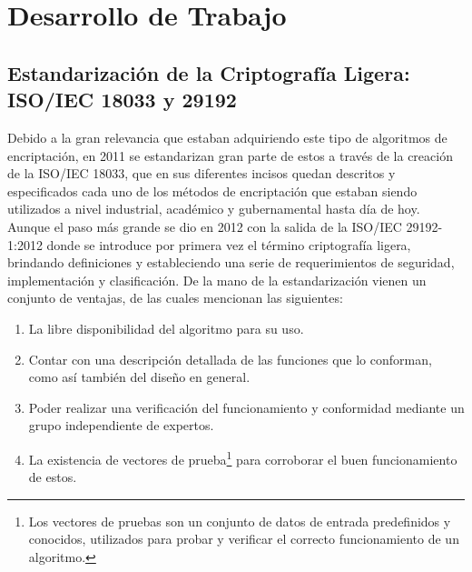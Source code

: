\documentclass[a4paper,10pt]{article}
\begin{document}
	\section{Desarrollo de Trabajo}
	\subsection{Estandarización de la Criptografía Ligera: ISO/IEC 18033 y 29192}
	Debido a la gran relevancia que estaban adquiriendo este tipo de algoritmos de encriptación, en 2011 se estandarizan gran parte de estos a través de la creación de la ISO/IEC 18033, que en sus diferentes incisos quedan descritos y especificados cada uno de los métodos de encriptación que estaban siendo utilizados a nivel industrial, académico y gubernamental hasta día de hoy. Aunque el paso más grande se dio en 2012 con la salida de la ISO/IEC 29192-1:2012 donde se introduce por primera vez el término criptografía ligera, brindando definiciones y estableciendo una serie de requerimientos de seguridad, implementación y clasificación. De la mano de la estandarización vienen un conjunto de ventajas, de las cuales \textcite{eterovic15stream} mencionan las siguientes:
	\begin{enumerate}
		\item La libre disponibilidad del algoritmo para su uso. 
		\item Contar con una descripción detallada de las funciones que lo conforman, como así también del diseño en general. 
		\item Poder realizar una verificación del funcionamiento y conformidad mediante un grupo independiente de expertos. 
		\item La existencia de vectores de prueba\footnote{Los vectores de pruebas son un conjunto de datos de entrada predefinidos y conocidos, utilizados para probar y verificar el correcto funcionamiento de un algoritmo.} para corroborar el buen funcionamiento de estos.
	\end{enumerate}
\end{document}
